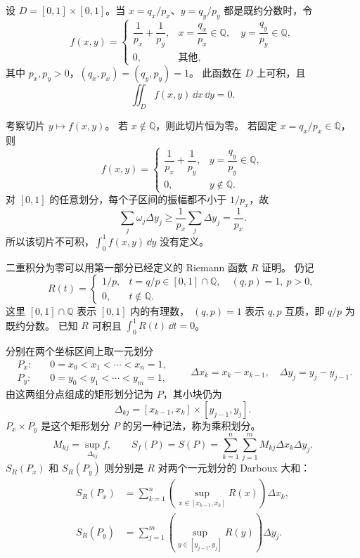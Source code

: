 \begin{example}[二重积分存在而某些切片不可积]
设 $D=[0,1]\times[0,1]$。当 $x=q_x/p_x$、$y=q_y/p_y$
都是既约分数时，令
\[
f(x,y)=
\begin{cases}
\dfrac1{p_x}+\dfrac1{p_y},
&x=\dfrac{q_x}{p_x}\in\mathbb Q,\quad
y=\dfrac{q_y}{p_y}\in\mathbb Q,\\[6pt]
0,&\text{其他},
\end{cases}
\]
其中 $p_x,p_y>0$，$(q_x,p_x)=(q_y,p_y)=1$。
此函数在 $D$ 上可积，且
\[
\iint_D f(x,y)\,\dd x\,\dd y=0.
\]

考察切片 $y\mapsto f(x,y)$。
若 $x\notin\mathbb Q$，则此切片恒为零。
若固定 $x=q_x/p_x\in\mathbb Q$，则
\[
f(x,y)=
\begin{cases}
\dfrac1{p_x}+\dfrac1{p_y},&y=\dfrac{q_y}{p_y}\in\mathbb Q,\\[6pt]
0,&y\notin\mathbb Q.
\end{cases}
\]
对 $[0,1]$ 的任意划分，每个子区间的振幅都不小于 $1/p_x$，故
\[
\sum_j\omega_j\Delta y_j
\ge\frac1{p_x}\sum_j\Delta y_j=\frac1{p_x}.
\]
所以该切片不可积，$\displaystyle \int_0^1 f(x,y)\,\dd y$ 没有定义。

二重积分为零可以用第一部分已经定义的 Riemann 函数 $R$ 证明。
仍记
\[
R(t)=
\begin{cases}
1/p,&t=q/p\in[0,1]\cap\mathbb Q,\quad (q,p)=1,\ p>0,\\
0,&t\notin\mathbb Q.
\end{cases}
\]
这里 $[0,1]\cap\mathbb Q$ 表示 $[0,1]$ 内的有理数，
$(q,p)=1$ 表示 $q,p$ 互质，即 $q/p$ 为既约分数。
已知 $R$ 可积且 $\displaystyle\int_0^1R(t)\,\dd t=0$。

分别在两个坐标区间上取一元划分
\[
\begin{aligned}
P_x:&\quad 0=x_0<x_1<\cdots<x_n=1,\\
P_y:&\quad 0=y_0<y_1<\cdots<y_m=1,
\end{aligned}
\qquad
\Delta x_k=x_k-x_{k-1},\quad
\Delta y_j=y_j-y_{j-1}.
\]
由这两组分点组成的矩形划分记为 $P$，其小块仍为
\[
\Delta_{kj}=[x_{k-1},x_k]\times[y_{j-1},y_j].
\]
$P_x\times P_y$ 是这个矩形划分 $P$ 的另一种记法，称为乘积划分。
\[
M_{kj}=\sup_{\Delta_{kj}}f,\qquad
S_f(P)=S(P)=\sum_{k=1}^n\sum_{j=1}^m
M_{kj}\Delta x_k\Delta y_j.
\]
$S_R(P_x)$ 和 $S_R(P_y)$ 则分别是 $R$ 对两个一元划分的 Darboux 大和：
\[
\begin{aligned}
S_R(P_x)
&=\sum_{k=1}^n
\left(\sup_{x\in[x_{k-1},x_k]}R(x)\right)\Delta x_k,\\
S_R(P_y)
&=\sum_{j=1}^m
\left(\sup_{y\in[y_{j-1},y_j]}R(y)\right)\Delta y_j.
\end{aligned}
\]



\end{example}
